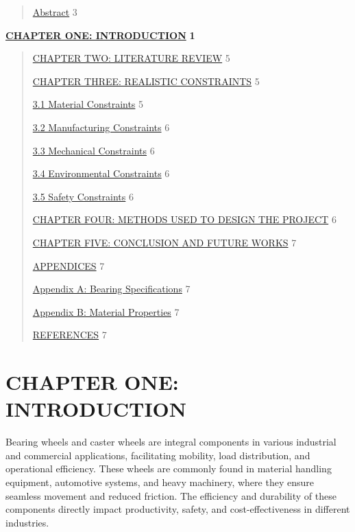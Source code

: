\documentclass[../../main]{subfiles}
\begin{document}
\begin{quote}
\hyperref[abstract]{Abstract} 3
\end{quote}

\hyperref[_fbcvpr48hba]{\textbf{CHAPTER ONE: INTRODUCTION}} \textbf{1}

\begin{quote}
\hyperref[_3wbx3vhwqqrx]{CHAPTER TWO: LITERATURE REVIEW} 5

\hyperref[chapter-three-realistic-constraints]{CHAPTER THREE: REALISTIC
CONSTRAINTS} 5

\hyperref[material-constraints]{3.1 Material Constraints} 5

\hyperref[manufacturing-constraints]{3.2 Manufacturing Constraints} 6

\hyperref[mechanical-constraints]{3.3 Mechanical Constraints} 6

\hyperref[environmental-constraints]{3.4 Environmental Constraints} 6

\hyperref[safety-constraints]{3.5 Safety Constraints} 6

\hyperref[chapter-four-methods-used-to-design-the-project]{CHAPTER FOUR:
METHODS USED TO DESIGN THE PROJECT} 6

\hyperref[chapter-five-conclusion-and-future-works]{CHAPTER FIVE:
CONCLUSION AND FUTURE WORKS} 7

\hyperref[appendices]{APPENDICES} 7

\hyperref[appendix-a-bearing-specifications]{Appendix A: Bearing
Specifications} 7

\hyperref[appendix-b-material-properties]{Appendix B: Material
Properties} 7

\hyperref[references]{REFERENCES} 7
\end{quote}

\section{CHAPTER ONE: INTRODUCTION}\label{chapter-one-introduction}

Bearing wheels and caster wheels are integral components in various
industrial and commercial applications, facilitating mobility, load
distribution, and operational efficiency. These wheels are commonly
found in material handling equipment, automotive systems, and heavy
machinery, where they ensure seamless movement and reduced friction. The
efficiency and durability of these components directly impact
productivity, safety, and cost-effectiveness in different industries.
\end{document}
